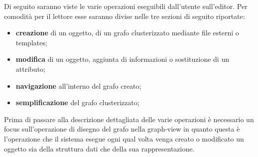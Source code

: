 \large{
Di seguito saranno viste le varie operazioni eseguibili dall'utente sull'editor. Per comodità per il lettore esse saranno divise nelle tre sezioni di seguito riportate:
\begin{itemize}
	\item \textbf{creazione} di un oggetto, di un grafo clusterizzato mediante file esterni o templates;
	\item \textbf{modifica} di un oggetto, aggiunta di informazioni o sostituzione di un attributo;
	\item \textbf{navigazione} all'interno del grafo creato; 
	\item \textbf{semplificazione} del grafo clusterizzato; 
\end{itemize}
Prima di passare alla descrizione dettagliata delle varie operazioni è necessario un focus sull'operazione di disegno del grafo nella graph-view in quanto questa è l'operazione che il sistema esegue ogni qual volta venga creato o modificato un oggetto sia della struttura dati che della sua rappresentazione.
}
